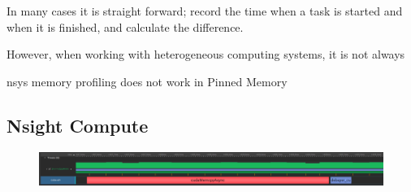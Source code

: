 In many cases it is straight forward; record the time when a task is started and when it is finished, and calculate the difference.


However, when working with heterogeneous computing systems, it is not always

nsys memory profiling does not work in Pinned Memory

\subsection{Nsight Compute}
\begin{figure}[H]
    \centering
    \includegraphics[width=\textwidth]{figures/memory_comparaison.png}
\end{figure}







